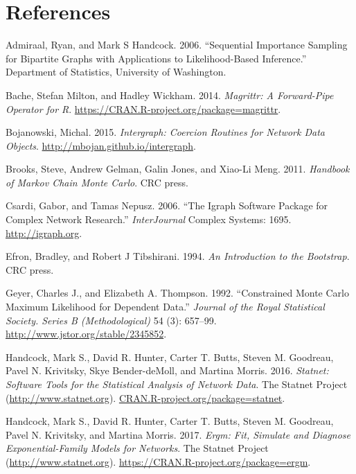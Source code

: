 \documentclass[]{book}
\begin{document}


\hypertarget{references}{%
\chapter*{References}\label{references}}

\hypertarget{refs}{}
\leavevmode\hypertarget{ref-admiraal2006}{}%
Admiraal, Ryan, and Mark S Handcock. 2006. ``Sequential Importance Sampling for Bipartite Graphs with Applications to Likelihood-Based Inference.'' Department of Statistics, University of Washington.

\leavevmode\hypertarget{ref-R-magrittr}{}%
Bache, Stefan Milton, and Hadley Wickham. 2014. \emph{Magrittr: A Forward-Pipe Operator for R}. \url{https://CRAN.R-project.org/package=magrittr}.

\leavevmode\hypertarget{ref-R-intergraph}{}%
Bojanowski, Michal. 2015. \emph{Intergraph: Coercion Routines for Network Data Objects}. \url{http://mbojan.github.io/intergraph}.

\leavevmode\hypertarget{ref-brooks2011}{}%
Brooks, Steve, Andrew Gelman, Galin Jones, and Xiao-Li Meng. 2011. \emph{Handbook of Markov Chain Monte Carlo}. CRC press.

\leavevmode\hypertarget{ref-R-igraph}{}%
Csardi, Gabor, and Tamas Nepusz. 2006. ``The Igraph Software Package for Complex Network Research.'' \emph{InterJournal} Complex Systems: 1695. \url{http://igraph.org}.

\leavevmode\hypertarget{ref-Efron1994}{}%
Efron, Bradley, and Robert J Tibshirani. 1994. \emph{An Introduction to the Bootstrap}. CRC press.

\leavevmode\hypertarget{ref-Geyer1992}{}%
Geyer, Charles J., and Elizabeth A. Thompson. 1992. ``Constrained Monte Carlo Maximum Likelihood for Dependent Data.'' \emph{Journal of the Royal Statistical Society. Series B (Methodological)} 54 (3): 657--99. \url{http://www.jstor.org/stable/2345852}.

\leavevmode\hypertarget{ref-R-statnet}{}%
Handcock, Mark S., David R. Hunter, Carter T. Butts, Steven M. Goodreau, Pavel N. Krivitsky, Skye Bender-deMoll, and Martina Morris. 2016. \emph{Statnet: Software Tools for the Statistical Analysis of Network Data}. The Statnet Project (\url{http://www.statnet.org}). \url{CRAN.R-project.org/package=statnet}.

\leavevmode\hypertarget{ref-R-ergm}{}%
Handcock, Mark S., David R. Hunter, Carter T. Butts, Steven M. Goodreau, Pavel N. Krivitsky, and Martina Morris. 2017. \emph{Ergm: Fit, Simulate and Diagnose Exponential-Family Models for Networks}. The Statnet Project (\url{http://www.statnet.org}). \url{https://CRAN.R-project.org/package=ergm}.
\end{document}
